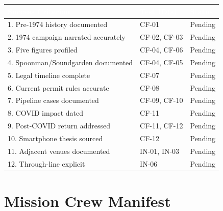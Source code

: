 \documentclass[11pt,letterpaper]{article}
\newcommand{\tableheader}[1]{\textbf{\sffamily\textcolor{white}{#1}}}
\begin{document}
\begin{center}
\begin{tabularx}{\textwidth}{XL{3.5cm}C{1.5cm}}
\toprule
{}
\tableheader{Success Criterion} & \tableheader{Test ID(s)} & \tableheader{Status} \\
. Pre-1974 history documented & CF-01 & Pending \\
2. 1974 campaign narrated accurately & CF-02, CF-03 & Pending \\
3. Five figures profiled & CF-04, CF-06 & Pending \\
4. Spoonman/Soundgarden documented & CF-04, CF-05 & Pending \\
5. Legal timeline complete & CF-07 & Pending \\
6. Current permit rules accurate & CF-08 & Pending \\
7. Pipeline cases documented & CF-09, CF-10 & Pending \\
8. COVID impact dated & CF-11 & Pending \\
9. Post-COVID return addressed & CF-11, CF-12 & Pending \\
10. Smartphone thesis sourced & CF-12 & Pending \\
11. Adjacent venues documented & IN-01, IN-03 & Pending \\
12. Through-line explicit & IN-06 & Pending \\
\bottomrule
\end{tabularx}
\end{center}

\section{Mission Crew Manifest}
\end{document}
